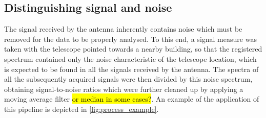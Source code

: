 \subsection{Distinguishing signal and noise}
The signal received by the antenna inherently contains noise which must be removed for the data to be properly analysed.
To this end, a signal measure was taken with the telescope pointed towards a nearby building, so that the registered spectrum  contained only the noise characteristic of the telescope location, which is expected to be found in all the signals received by the antenna.
The spectra of all the subsequently acquired signals were then divided by this noise spectrum, obtaining  signal-to-noise ratios which were further cleaned up by applying a moving average filter \hl{or median in some cases?}.
An example of the application of this pipeline is depicted in \autoref{fig:process_example}.

